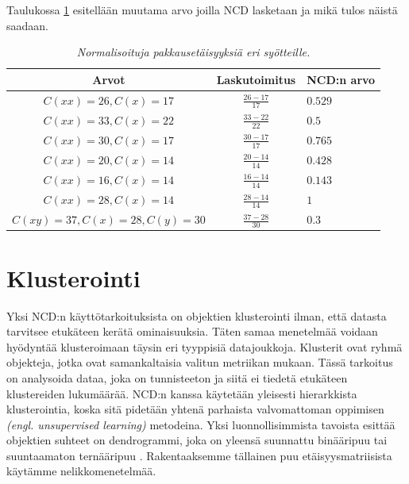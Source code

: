 \documentclass[12pt,finnish,final]{tktltiki2}
\theoremstyle{definition}
\theoremstyle{remark}
\newcommand{\engl}[1]{\emph{(engl. #1)}}
\begin{document}
  Taulukossa \ref{tab:NCD-values} esitellään muutama arvo joilla NCD lasketaan ja mikä tulos näistä saadaan.

  \begin{table}[t]
    \begin{tabular}{c|c|l}
      Arvot                    & Laskutoimitus      & NCD:n arvo        \\ \hline
      $ C(xx) = 26, C(x) = 17$ & $\frac{26-17}{17} $ & $0.529$          \\ \hline
      $ C(xx) = 33, C(x) = 22$ & $\frac{33-22}{22} $ & $0.5$            \\ \hline
      $ C(xx) = 30, C(x) = 17$ & $\frac{30-17}{17} $ & $0.765$          \\ \hline
      $ C(xx) = 20, C(x) = 14$ & $\frac{20-14}{14} $ & $0.428$          \\ \hline
      $ C(xx) = 16, C(x) = 14$ & $\frac{16-14}{14} $ & $0.143$          \\ \hline
      $ C(xx) = 28, C(x) = 14$ & $\frac{28-14}{14} $ & $1$              \\ \hline
      $ C(xy) = 37, C(x) = 28, C(y) = 30$ & $\frac{37-28}{30} $ & $0.3$ \\
    \end{tabular}
    \caption{\emph{Normalisoituja pakkausetäisyyksiä eri syötteille.}}
    \label{tab:NCD-values}
  \end{table}


\section{Klusterointi} %
\label{sec:klusterointi}

  Yksi NCD:n käyttötarkoituksista on objektien klusterointi ilman, että datasta tarvitsee etukäteen kerätä ominaisuuksia.
  Täten samaa menetelmää voidaan hyödyntää klusteroimaan täysin eri tyyppisiä datajoukkoja.
  Klusterit ovat ryhmä objekteja, jotka ovat samankaltaisia valitun metriikan mukaan.
  Tässä tarkoitus on analysoida dataa, joka on tunnisteeton ja siitä ei tiedetä etukäteen klustereiden lukumäärää.
  NCD:n kanssa käytetään yleisesti hierarkkista klusterointia, koska sitä pidetään yhtenä parhaista valvomattoman oppimisen \engl{unsupervised learning} metodeina.
  Yksi luonnollisimmista tavoista esittää objektien suhteet on dendrogrammi, joka on yleensä suunnattu binääripuu tai suuntaamaton ternääripuu \cite{cilibrasi2004algorithmic}.
  Rakentaaksemme tällainen puu etäisyysmatriisista käytämme nelikkomenetelmää.
\end{document}
